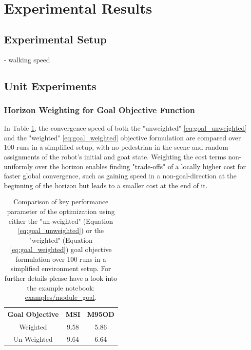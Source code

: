 \section{Experimental Results}
\label{text:experiments/results}

\subsection{Experimental Setup}
- walking speed \cite{Bohannon1997}

\subsection{Unit Experiments}
\subsubsection{Horizon Weighting for Goal Objective Function}
In Table \ref{table:goal_horizon_weighting}, the convergence speed of both the "unweighted" \ref{eq:goal_unweighted} and the "weighted" \ref{eq:goal_weighted} objective formulation are compared over 100 runs in a simplified setup, with no pedestrian in the scene and random assignments of the robot's initial and goat state. Weighting the cost terms non-uniformly over the horizon enables finding "trade-offs" of a locally higher cost for faster global convergence, such as gaining speed in a non-goal-direction at the beginning of the horizon but leads to a smaller cost at the end of it.

\begin{table}[!ht]
\begin{center}
\begin{tabular}{c|c|c}
\bf Goal Objective & \bf MSI & \bf M95OD \\
\hline
Weighted & 9.58 & 5.86 \\
\hline
Un-Weighted & 9.64 & 6.64 \\
\end{tabular}
\caption{Comparison of key performance parameter of the optimization using either the "un-weighted" (Equation \ref{eq:goal_unweighted}) or the "weighted" (Equation  \ref{eq:goal_weighted}) goal objective formulation over 100 runs in a simplified environment setup. For further details please have a look into the example notebook: \href{https://github.com/simon-schaefer/mantrap/blob/master/examples/module_goal.ipynb}{examples/module\_goal}.}
\label{table:goal_horizon_weighting}
\end{center}
\end{table}

